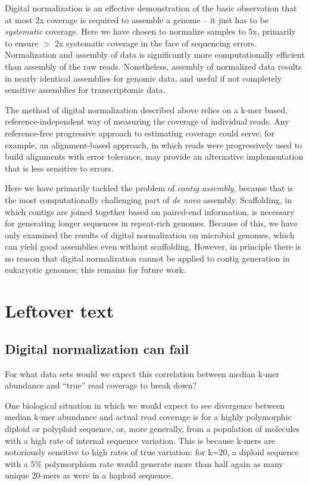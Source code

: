\documentclass[10pt]{article}
\begin{document}
Digital normalization is an effective demonstration of the basic
observation that at most 2x coverage is required to assemble a genome
-- it just has to be {\em systematic} coverage.  Here we have chosen
to normalize samples to 5x, primarily to ensure $>$ 2x systematic
coverage in the face of sequencing errors.  Normalization and assembly
of data is significantly more computationally efficient than assembly
of the raw reads.  Nonetheless, assembly of normalized data results in
nearly identical assemblies for genomic data, and useful if not
completely sensitive assemblies for transcriptomic data.

The method of digital normalization described above relies on a k-mer
based, reference-independent way of measuring the coverage of
individual reads.  Any reference-free progressive approach to
estimating coverage could serve; for example, an alignment-based
approach, in which reads were progressively used to build alignments
with error tolerance, may provide an alternative implementation that
is less sensitive to errors.

Here we have primarily tackled the problem of {\em contig assembly},
because that is the most computationally challenging part of {\em de
  novo} assembly.  Scaffolding, in which contigs are joined together
based on paired-end information, is necessary for generating longer
sequences in repeat-rich genomes.  Because of this, we have only
examined the results of digital normalization on microbial genomes,
which can yield good assemblies even without scaffolding.  However, in
principle there is no reason that digital normalization cannot be
applied to contig generation in eukaryotic genomes; this remains for
future work.

\section*{Leftover text}

\subsection*{Digital normalization can fail}

For what data sets would we expect this correlation between median
k-mer abundance and ``true'' read coverage to break down?

One biological situation in which we would expect to see divergence
between median k-mer abundance and actual read coverage is for a
highly polymorphic diploid or polyploid sequence, or, more generally,
from a population of molecules with a high rate of internal sequence
variation.  This is because k-mers are notoriously sensitive to high
rates of true variation: for k=20, a diploid sequence with a 5\%
polymorphism rate would generate more than half again as many unique
20-mers as were in a haploid sequence.
\end{document}
